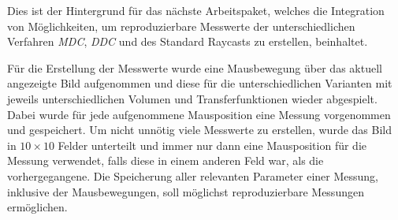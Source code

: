Dies ist der Hintergrund für das nächste Arbeitspaket, welches die Integration von Möglichkeiten, um reproduzierbare Messwerte der unterschiedlichen Verfahren \emph{MDC}, \emph{DDC} und des Standard Raycasts zu erstellen, beinhaltet.

Für die Erstellung der Messwerte wurde eine Mausbewegung über das aktuell angezeigte Bild aufgenommen und diese für die unterschiedlichen Varianten mit jeweils unterschiedlichen Volumen und Transferfunktionen wieder abgespielt.
Dabei wurde für jede aufgenommene Mausposition eine Messung vorgenommen und gespeichert.
Um nicht unnötig viele Messwerte zu erstellen, wurde das Bild in $10\times10$ Felder unterteilt und immer nur dann eine Mausposition für die Messung verwendet, falls diese in einem anderen Feld war, als die vorhergegangene.
Die Speicherung aller relevanten Parameter einer Messung, inklusive der Mausbewegungen, soll möglichst reproduzierbare Messungen ermöglichen.

